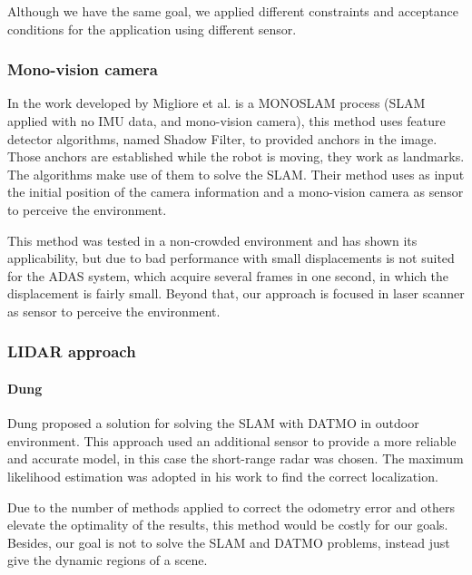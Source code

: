 Although we have the same goal, we applied different constraints and acceptance conditions for the application using different sensor. 

\subsubsection{Mono-vision camera}

In the work developed by Migliore et al. \cite{Migliore_2009_ICRA} is a MONOSLAM process (SLAM applied with no IMU data, and mono-vision camera), this method uses feature detector algorithms, named Shadow Filter, to provided anchors in the image. Those anchors are established while the robot is moving, they work as landmarks. The algorithms make use of them to solve the SLAM. Their method uses as input the initial position of the camera information and a mono-vision camera as sensor to perceive the environment. %

This method was tested in a non-crowded environment and has shown its applicability, but due to bad performance with small displacements is not suited for the ADAS system, which acquire several frames in one second, in which the displacement is fairly small. Beyond that, our approach is focused in laser scanner as sensor to perceive the environment.

\subsubsection{LIDAR approach}

\paragraph*{Dung}

Dung \cite{DBLP:journals/inffus/VuBA11} proposed a solution for solving the SLAM with DATMO in outdoor environment. This approach used an additional sensor to provide a more reliable and accurate model, in this case the short-range radar was chosen. The maximum likelihood estimation was adopted in his work to find the correct localization. 

Due to the number of methods applied to correct the odometry error and others elevate the optimality of the results, this method would be costly for our goals. Besides, our goal is not to solve the SLAM and DATMO problems, instead just give the dynamic regions of a scene.

